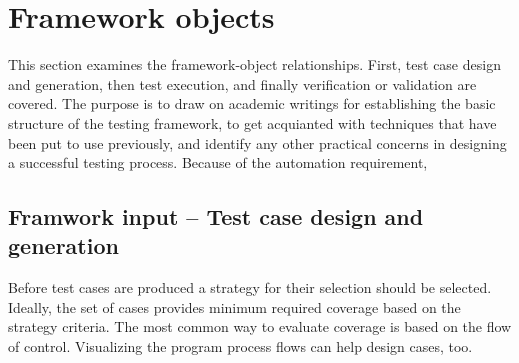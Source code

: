 \documentclass[12pt,a4paper,oneside,pdftex]{report}
\begin{document}
{%







\section{Framework objects}

This section examines the framework-object relationships. First, test case design and generation, then test execution, and finally verification or validation are covered. The purpose is to draw on academic writings for establishing the basic structure of the testing framework, to get acquianted with techniques that have been put to use previously, and identify any other practical concerns in designing a successful testing process. Because of the automation requirement, 

\subsection{Framwork input -- Test case design and generation}

Before test cases are produced a strategy for their selection should be selected. Ideally, the set of cases provides minimum required coverage based on the strategy criteria. The most common way to evaluate coverage is based on the flow of control. Visualizing the program process flows can help design cases, too. \citep{burnstein2003practical} 

}
\end{document}
